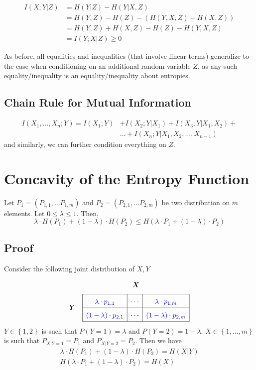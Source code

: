 \documentclass{article}
\begin{document}
\begin{align*}
    I(X;Y|Z) &= H(Y|Z) - H(Y|X,Z)\\
    &= H(Y,Z) - H(Z)- \left(H(Y,X,Z) - H(X,Z)\right)\\
    &= H(Y,Z) + H(X,Z) - H(Z) - H(Y,X,Z)\\
    &= I(Y;X|Z)\geq 0
\end{align*}

As before, all equalities and inequalities (that involve linear terms) generalize to the case when conditioning on an additional random variable $Z$, as any such equality/inequality is an equality/inequality about entropies.

\subsection{Chain Rule for Mutual Information}

\begin{align*}
    I(X_1,\ldots,X_n;Y) = I(X_1;Y) &+ I(X_2;Y|X_1) + I(X_3;Y|X_1,X_2)+\\
    &\ldots + I(X_n;Y|X_1,X_2,\ldots, X_{n-1})
\end{align*}
and similarly, we can further condition everything on $Z$.

\section{Concavity of the Entropy Function}

Let $P_1=(P_{1,1},\ldots P_{1,m})$ and $P_2=(P_{2,1},\ldots P_{2,m})$ be two distribution on $m$ elements. Let $0\leq \lambda \leq 1$. Then,
\[
\lambda\cdot H(P_1) + (1-\lambda) \cdot H(P_2)\leq H(\lambda \cdot P_1 + (1-\lambda)\cdot P_2)
\]

\subsection{Proof}

Consider the following joint distribution of $X,Y$
\[
\renewcommand{\arraystretch}{1.6}
\begin{array}{cc}
& \boldsymbol{X} \\[4pt]
\boldsymbol{Y} &
\begin{array}{|c|c|c|}
\hline
\color{blue}\lambda \cdot p_{1,1} & \cdots & \color{blue}\lambda \cdot p_{1,m} \\
\hline
\color{blue}(1-\lambda)\cdot p_{2,1} & \cdots & \color{blue}(1-\lambda)\cdot p_{2,m} \\
\hline
\end{array}
\end{array}
\]
$Y\in\left\{1,2\right\}$ is such that $P(Y=1)=\lambda$ and $P(Y=2)=1-\lambda$. $X\in\left\{1,\ldots,m\right\}$ is such that $P_{X|Y=1}=P_1$ and $P_{X|Y=2}=P_2$. Then we have
\begin{gather*}
    \lambda\cdot H(P_1) + \left(1-\lambda\right) \cdot H(P_2)=H(X|Y)\\
    H(\lambda\cdot P_1 + \left(1-\lambda\right)\cdot P_2)=H(X)
\end{gather*}
\end{document}
